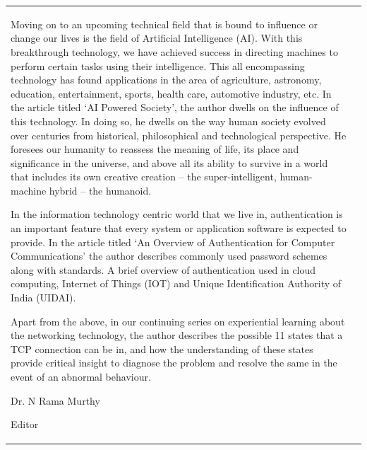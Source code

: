 {\begin{tabular}{p{.2\paperwidth}@{}!{\color{goldan-yellow}\vline width 1.5pt}p{.64\paperwidth}}
\bigskip
Moving on to an upcoming technical field that is bound to influence or change our lives is the field of Artificial Intelligence (AI). With this breakthrough technology, we have achieved success in directing machines to perform certain tasks using their intelligence. This all encompassing technology has found applications in the area of agriculture, astronomy, education, entertainment, sports, health care, automotive industry, etc.  In the article titled ‘AI Powered Society’, the author dwells on the influence of this technology. In doing so, he dwells on the way human society evolved over centuries from historical, philosophical and technological perspective.  He foresees our humanity to reassess the meaning of life, its place and significance in the universe, and above all its ability to survive in a world that includes its own creative creation – the super-intelligent, human-machine hybrid – the humanoid.

\bigskip
In the information technology centric world that we live in, authentication is an important feature that every system or application software is expected to provide. In the article titled ‘An Overview of Authentication for Computer Communications’ the author describes commonly used password schemes along with standards. A brief overview of authentication used in cloud computing, Internet of Things (IOT) and Unique Identification Authority of India (UIDAI).

\bigskip
Apart from the above, in our continuing series on experiential learning about the networking technology, the author describes the possible 11 states that a TCP connection can be in, and how the understanding of these states provide critical insight to diagnose the problem and resolve the same in the event of an abnormal behaviour. 

\vskip 3cm


\bigskip

\hfill  Dr. N Rama Murthy\hspace{1cm}\,

\vskip 2pt

\hfill Editor\hspace{3.15cm}\,

\end{tabular}
}





